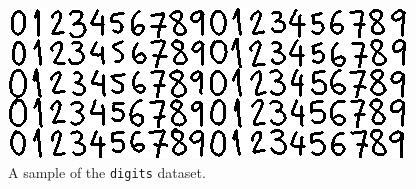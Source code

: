 \documentclass{amsart}
\theoremstyle{plain}
\numberwithin{equation}{section}
\newcommand{\code}[1]{\lstinline[mathescape=true]{#1}}
\begin{document}
\begin{figure}[h]
  \centering\includegraphics[scale=0.8]{imgs/digits_sample.png}
  \caption{A sample of the \code{digits} dataset.}
\end{figure}


\newpage
\appendix

\newpage

\printbibliography[]
\end{document}
